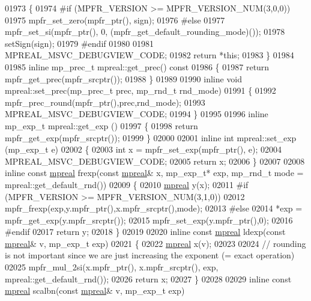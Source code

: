 \begin{DoxyCode}
{{01973 \{
01974 \textcolor{preprocessor}{#if (MPFR\_VERSION >= MPFR\_VERSION\_NUM(3,0,0))}
01975     mpfr\_set\_zero(mpfr\_ptr(), sign);
01976 \textcolor{preprocessor}{#else}
01977     mpfr\_set\_si(mpfr\_ptr(), 0, (mpfr\_get\_default\_rounding\_mode)());
01978     setSign(sign);
01979 \textcolor{preprocessor}{#endif}
01980 
01981     MPREAL\_MSVC\_DEBUGVIEW\_CODE;
01982     \textcolor{keywordflow}{return} *\textcolor{keyword}{this};
01983 \}
01984 
01985 \textcolor{keyword}{inline} mp\_prec\_t mpreal::get\_prec()\textcolor{keyword}{ const}
01986 \textcolor{keyword}{}\{
01987     \textcolor{keywordflow}{return} mpfr\_get\_prec(mpfr\_srcptr());
01988 \}
01989 
01990 \textcolor{keyword}{inline} \textcolor{keywordtype}{void} mpreal::set\_prec(mp\_prec\_t prec, mp\_rnd\_t rnd\_mode)
01991 \{
01992     mpfr\_prec\_round(mpfr\_ptr(),prec,rnd\_mode);
01993     MPREAL\_MSVC\_DEBUGVIEW\_CODE;
01994 \}
01995 
01996 \textcolor{keyword}{inline} mp\_exp\_t mpreal::get\_exp ()
01997 \{
01998     \textcolor{keywordflow}{return} mpfr\_get\_exp(mpfr\_srcptr());
01999 \}
02000 
02001 \textcolor{keyword}{inline} \textcolor{keywordtype}{int} mpreal::set\_exp (mp\_exp\_t e)
02002 \{
02003     \textcolor{keywordtype}{int} x = mpfr\_set\_exp(mpfr\_ptr(), e);
02004     MPREAL\_MSVC\_DEBUGVIEW\_CODE;
02005     \textcolor{keywordflow}{return} x;
02006 \}
02007 
02008 \textcolor{keyword}{inline} \textcolor{keyword}{const} \hyperlink{classmpfr_1_1mpreal}{mpreal} frexp(\textcolor{keyword}{const} \hyperlink{classmpfr_1_1mpreal}{mpreal}& x, mp\_exp\_t* exp, mp\_rnd\_t mode = 
      mpreal::get\_default\_rnd())
02009 \{
02010     \hyperlink{classmpfr_1_1mpreal}{mpreal} y(x);
02011 \textcolor{preprocessor}{#if (MPFR\_VERSION >= MPFR\_VERSION\_NUM(3,1,0))}
02012     mpfr\_frexp(exp,y.mpfr\_ptr(),x.mpfr\_srcptr(),mode);
02013 \textcolor{preprocessor}{#else}
02014     *exp = mpfr\_get\_exp(y.mpfr\_srcptr());
02015     mpfr\_set\_exp(y.mpfr\_ptr(),0);
02016 \textcolor{preprocessor}{#endif}
02017     \textcolor{keywordflow}{return} y;
02018 \}
02019 
02020 \textcolor{keyword}{inline} \textcolor{keyword}{const} \hyperlink{classmpfr_1_1mpreal}{mpreal} ldexp(\textcolor{keyword}{const} \hyperlink{classmpfr_1_1mpreal}{mpreal}& v, mp\_exp\_t exp)
02021 \{
02022     \hyperlink{classmpfr_1_1mpreal}{mpreal} x(v);
02023 
02024     \textcolor{comment}{// rounding is not important since we are just increasing the exponent (= exact operation)}
02025     mpfr\_mul\_2si(x.mpfr\_ptr(), x.mpfr\_srcptr(), exp, mpreal::get\_default\_rnd());
02026     \textcolor{keywordflow}{return} x;
02027 \}
02028 
02029 \textcolor{keyword}{inline} \textcolor{keyword}{const} \hyperlink{classmpfr_1_1mpreal}{mpreal} scalbn(\textcolor{keyword}{const} \hyperlink{classmpfr_1_1mpreal}{mpreal}& v, mp\_exp\_t exp)
}}
\end{DoxyCode}
